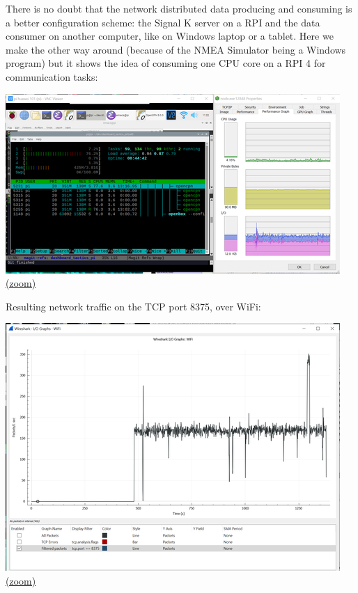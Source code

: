 \documentclass[11pt]{article}
\begin{document}
    There is no doubt that the network distributed data producing and
consuming is a better configuration scheme: the Signal K server on a RPI
and the data consumer on another computer, like on Windows laptop or a
tablet. Here we make the other way around (because of the NMEA Simulator
being a Windows program) but it shows the idea of consuming one CPU core
on a RPI 4 for communication tasks:

    \includegraphics{2020-02-09_dgb_htop_procexp_01_instrujs_clients_alpha_02_sk1-21-0_RPIclient_WinSKsrv.png}
\href{img/2020-02-09_dgb_htop_procexp_01_instrujs_clients_alpha_02_sk1-21-0_RPIclient_WinSKsrv.png}{(zoom)}

    Resulting network traffic on the TCP port 8375, over WiFi:

    \includegraphics{2020-02-09_wireshark_wifi_rate_8375TCP_procexp_01_instrujs_clients_alpha_02_sk1-21-0_RPIclient_WinSKsrv.png}
\href{2020-02-09_wireshark_wifi_rate_8375TCP_procexp_01_instrujs_clients_alpha_02_sk1-21-0_RPIclient_WinSKsrv.png}{(zoom)}
\end{document}
